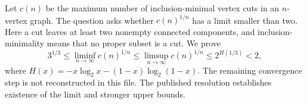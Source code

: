 Let $c(n)$ be the maximum number of inclusion-minimal vertex cuts in an $n$-vertex graph. The question asks whether $c(n)^{1/n}$ has a limit smaller than two. Here a cut leaves at least two nonempty connected components, and inclusion-minimality means that no proper subset is a cut. We prove
\[
 3^{1/3}\le\liminf_{n\to\infty}c(n)^{1/n}
 \le\limsup_{n\to\infty}c(n)^{1/n}
 \le2^{H(1/3)}<2,\tag{1}
\]
where $H(x)=-x\log_2x-(1-x)\log_2(1-x)$. The remaining convergence step is not reconstructed in this file. The published resolution establishes existence of the limit and stronger upper bounds.
